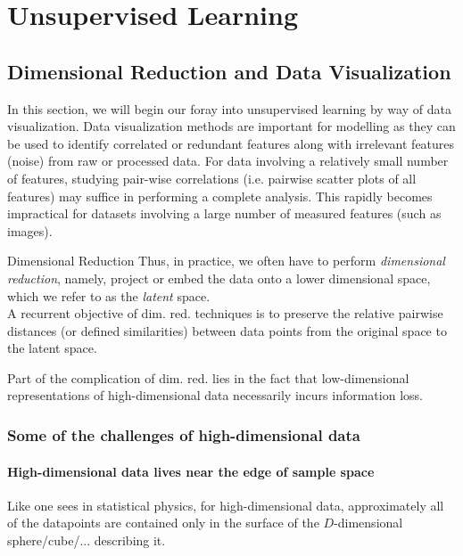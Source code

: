 \chapter{Unsupervised Learning}
\section{Dimensional Reduction and Data Visualization}
\label{sec:dimRed}
In this section, we will begin our foray into unsupervised learning by way of data visualization. Data visualization methods are important for modelling as they can be used to identify correlated or redundant features along with irrelevant features (noise) from raw or processed data. For data involving a relatively small number of features, studying pair-wise correlations (i.e. pairwise scatter plots of all features) may suffice in performing a complete analysis. This rapidly becomes impractical for datasets involving a large number of measured features (such as images). \begin{mybox}{Dimensional Reduction}
	Thus, in practice, we often have to perform \emph{dimensional reduction}, namely, project or embed the data onto a lower dimensional space, which we refer to as the \emph{latent} space.\\
	A recurrent objective of dim. red. techniques is to preserve the relative pairwise distances (or defined similarities) between data points from the original space to the latent space.
\end{mybox}
Part of the complication of dim. red. lies in the fact that low-dimensional representations of high-dimensional data necessarily incurs information loss.

\subsection{Some of the challenges of high-dimensional data}
\label{subsec:dimRedChallengesData}
\subsubsection{High-dimensional data lives near the edge of sample space}
Like one sees in statistical physics, for high-dimensional data, approximately all of the datapoints are contained only in the surface of the $D$-dimensional sphere/cube/... describing it.

